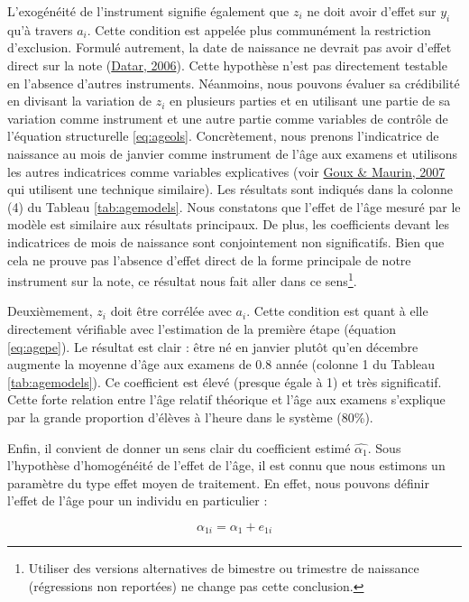 \documentclass[
]{book}
\begin{document}
L'exogénéité de l'instrument signifie également que \(z_i\) ne doit avoir d'effet sur \(y_i\) qu'à travers \(a_i\). Cette condition est appelée plus communément la restriction d'exclusion. Formulé autrement, la date de naissance ne devrait pas avoir d'effet direct sur la note (\protect\hyperlink{ref-DAT:06}{Datar, 2006}). Cette hypothèse n'est pas directement testable en l'absence d'autres instruments. Néanmoins, nous pouvons évaluer sa crédibilité en divisant la variation de \(z_i\) en plusieurs parties et en utilisant une partie de sa variation comme instrument et une autre partie comme variables de contrôle de l'équation structurelle \eqref{eq:ageols}. Concrètement, nous prenons l'indicatrice de naissance au mois de janvier comme instrument de l'âge aux examens et utilisons les autres indicatrices comme variables explicatives (voir \protect\hyperlink{ref-GOU:MAU:07}{Goux \& Maurin, 2007} qui utilisent une technique similaire). Les résultats sont indiqués dans la colonne (4) du Tableau \ref{tab:agemodels}. Nous constatons que l'effet de l'âge mesuré par le modèle est similaire aux résultats principaux. De plus, les coefficients devant les indicatrices de mois de naissance sont conjointement non significatifs. Bien que cela ne prouve pas l'absence d'effet direct de la forme principale de notre instrument sur la note, ce résultat nous fait aller dans ce sens\footnote{Utiliser des versions alternatives de bimestre ou trimestre de naissance (régressions non reportées) ne change pas cette conclusion.}.

\quad Deuxièmement, \(z_i\) doit être corrélée avec \(a_i\). Cette condition est quant à elle directement vérifiable avec l'estimation de la première étape (équation \ref{eq:agepe}). Le résultat est clair : être né en janvier plutôt qu'en décembre augmente la moyenne d'âge aux examens de 0.8 année (colonne 1 du Tableau \ref{tab:agemodels}). Ce coefficient est élevé (presque égale à 1) et très significatif. Cette forte relation entre l'âge relatif théorique et l'âge aux examens s'explique par la grande proportion d'élèves à l'heure dans le système (80\%).

\quad Enfin, il convient de donner un sens clair du coefficient estimé \(\hat{\alpha_1}\). Sous l'hypothèse d'homogénéité de l'effet de l'âge, il est connu que nous estimons un paramètre du type effet moyen de traitement. En effet, nous pouvons définir l'effet de l'âge pour un individu en particulier :

\begin{equation}
\label{eq:ageeffethetero}
\alpha_{1i} = \alpha_1 + e_{1i}
\end{equation}
\end{document}

